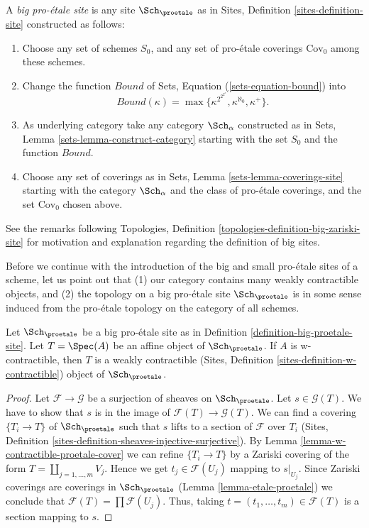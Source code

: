 \begin{definition}
\label{definition-big-proetale-site}
A {\it big pro-\'etale site} is any site $\Sch_\proetale$ as in
Sites, Definition \ref{sites-definition-site} constructed as follows:
\begin{enumerate}
\item Choose any set of schemes $S_0$, and any set of pro-\'etale coverings
$\text{Cov}_0$ among these schemes.
\item Change the function $Bound$ of
Sets, Equation (\ref{sets-equation-bound}) into
$$
Bound(\kappa) = \max\{\kappa^{2^{2^{2^\kappa}}}, \kappa^{\aleph_0}, \kappa^+\}.
$$
\item As underlying category take any category $\Sch_\alpha$
constructed as in Sets, Lemma \ref{sets-lemma-construct-category}
starting with the set $S_0$ and the function $Bound$.
\item Choose any set of coverings as in
Sets, Lemma \ref{sets-lemma-coverings-site} starting with the
category $\Sch_\alpha$ and the class of pro-\'etale coverings,
and the set $\text{Cov}_0$ chosen above.
\end{enumerate}
\end{definition}

\noindent
See the remarks following
Topologies, Definition \ref{topologies-definition-big-zariski-site}
for motivation and explanation regarding the definition of big sites.

\medskip\noindent
Before we continue with the introduction of the big and small
pro-\'etale sites of a scheme, let us point out that (1) our category
contains many weakly contractible objects, and (2) the topology on a
big pro-\'etale site $\Sch_\proetale$ is in some sense induced from
the pro-\'etale topology on the category of all schemes.

\begin{lemma}
\label{lemma-w-contractible-is-weakly-contractible}
Let $\Sch_\proetale$ be a big pro-\'etale site as in
Definition \ref{definition-big-proetale-site}.
Let $T = \Spec(A)$ be an affine object of $\Sch_\proetale$.
If $A$ is w-contractible, then $T$ is a weakly contractible
(Sites, Definition \ref{sites-definition-w-contractible})
object of $\Sch_\proetale$.
\end{lemma}

\begin{proof}
Let $\mathcal{F} \to \mathcal{G}$ be a surjection of sheaves on
$\Sch_\proetale$. Let $s \in \mathcal{G}(T)$. We have to show that
$s$ is in the image of $\mathcal{F}(T) \to \mathcal{G}(T)$. We can find a
covering $\{T_i \to T\}$ of $\Sch_\proetale$ such that $s$ lifts
to a section of $\mathcal{F}$ over $T_i$
(Sites, Definition \ref{sites-definition-sheaves-injective-surjective}).
By Lemma \ref{lemma-w-contractible-proetale-cover}
we can refine $\{T_i \to T\}$ by a Zariski
covering of the form $T = \coprod_{j = 1, \ldots, m} V_j$.
Hence we get $t_j \in \mathcal{F}(U_j)$ mapping to $s|_{U_j}$.
Since Zariski coverings are coverings in $\Sch_\proetale$
(Lemma \ref{lemma-etale-proetale}) we conclude that
$\mathcal{F}(T) = \prod \mathcal{F}(U_j)$.
Thus, taking $t = (t_1, \ldots, t_m) \in \mathcal{F}(T)$
is a section mapping to $s$.
\end{proof}

